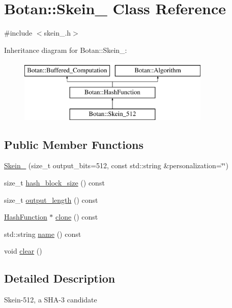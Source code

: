\hypertarget{classBotan_1_1Skein__512}{\section{Botan\-:\-:Skein\-\_ Class Reference}
\label{classBotan_1_1Skein__512}
}


{\ttfamily \#include $<$skein\-\_.\-h$>$}

Inheritance diagram for Botan\-:\-:Skein\-\_\-:\begin{figure}[H]
\begin{center}
\leavevmode
\includegraphics[height=3.000000cm]{classBotan_1_1Skein__512}
\end{center}
\end{figure}
\subsection*{Public Member Functions}
\begin{DoxyCompactItemize}
\item 
\hyperlink{classBotan_1_1Skein__512_a5a8970ea9fc9c055e7d2007eb0137d59}{Skein\-\_} (size\-\_\-t output\-\_\-bits=512, const std\-::string \&personalization=\char`\"{}\char`\"{})
\item 
size\-\_\-t \hyperlink{classBotan_1_1Skein__512_a64599ba58ecf174639e25f6d382650fe}{hash\-\_\-block\-\_\-size} () const 
\item 
size\-\_\-t \hyperlink{classBotan_1_1Skein__512_a6ad7a53da445738bd72d932aa21f4e82}{output\-\_\-length} () const 
\item 
\hyperlink{classBotan_1_1HashFunction}{Hash\-Function} $\ast$ \hyperlink{classBotan_1_1Skein__512_a47c7a6576753143091d25901ed83827e}{clone} () const 
\item 
std\-::string \hyperlink{classBotan_1_1Skein__512_ade97ab7bb7653543b1e05ff84034a2c2}{name} () const 
\item 
void \hyperlink{classBotan_1_1Skein__512_a6846f48d14a724c29c419d41dcf25379}{clear} ()
\end{DoxyCompactItemize}


\subsection{Detailed Description}
Skein-\/512, a S\-H\-A-\/3 candidate 

